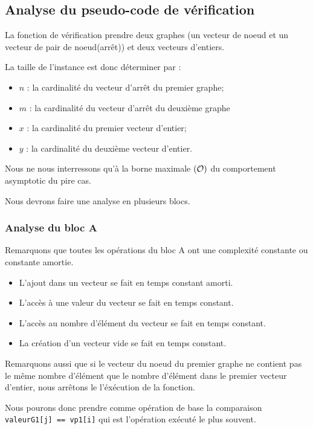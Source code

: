 \documentclass[class=article]{standalone}
\begin{document}
\subsection*{Analyse du pseudo-code de vérification}

La fonction de vérification prendre deux graphes 
(un vecteur de noeud et un vecteur de pair de noeud(arrêt))
et deux vecteurs d'entiers.

La taille de l'instance est donc déterminer par :
\begin{itemize}
  \item $n$ : la cardinalité du vecteur d'arrêt du premier graphe;
  \item $m$ : la cardinalité du vecteur d'arrêt du deuxième graphe
  \item $x$ : la cardinalité du premier vecteur d'entier;
  \item $y$ : la cardinalité du deuxième vecteur d'entier.
\end{itemize}

Nous ne nous interressons qu'à la borne maximale $\left ( \mathcal{O} \right )$ 
du comportement asymptotic du pire cas.

Nous devrons faire une analyse en plusieurs blocs.

\subsubsection*{Analyse du bloc A}

Remarquons que toutes les opérations du bloc A 
ont une complexité constante ou constante amortie.

\begin{itemize}
  \item L'ajout dans un vecteur se fait en temps constant amorti.
  \item L'accès à une valeur du vecteur se fait en temps constant.
  \item L'accès au nombre d'élément du vecteur se fait en temps constant.
  \item La création d'un vecteur vide se fait en temps constant.
\end{itemize}

Remarquons aussi que si le vecteur du noeud du premier graphe
ne contient pas le même nombre d'élément que le nombre d'élément 
dans le premier vecteur d'entier, nous arrêtons le l'éxécution de
la fonction.

Nous pourons donc prendre comme opération de base
la comparaison \lstinline{valeurG1[j] == vp1[i]} qui
est l'opération exécuté le plus souvent.
\end{document}
